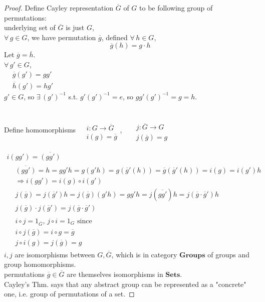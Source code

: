 \begin{proof}
	Define Cayley representation $\overline{G}$ of $G$ to be following group of permutations: \\
	underlying set of $\overline{G}$ is just $G$, \\
	$\forall \, g\in G$, we have permutation $\overline{g}$, defined $\forall \, h \in G$, 
	\[
	\overline{g}(h) = g\cdot h
	\]
	Let $\overline{g} = \overline{h}$. \\
	$\forall \, g' \in G$, \\
	$\begin{aligned}
	& \overline{g}(g') = gg' \\ 
	& \overline{h}(g') = hg'
	\end{aligned}$ \\
	$g' \in G$, so $\exists \, (g')^{-1}$ s.t. $g'(g')^{-1} =e$, so $gg'(g')^{-1}= g=h$.
	
	\quad \\
	Define homomorphisms $\begin{aligned} & \quad \\ 
	& i : G \to \overline{G} \\
	& i(g) = \overline{g}
	\end{aligned}$, \qquad \, $\begin{aligned} & \quad \\ 
	& j : \overline{G} \to G \\
	& j(\overline{g}) =  g
	\end{aligned}$
	
	\[
	\begin{gathered} 
	i(gg') = \overline{(gg')} \\
	\begin{aligned}
	& \overline{(gg')} = h = gg' h = g(g'h) = g(\overline{g}'(h)) = \overline{g}(\overline{g}'(h)) = i(g) = i(g') h \\ 
	& \Longrightarrow i(gg') = i(g) \circ i(g') \\
	& j(\overline{g}) = j(\overline{g}') h = j(\overline{g}) (g'h) = gg'h = j(\overline{gg'})h = j(\overline{g} \cdot \overline{g}') h \\
	& j(\overline{g}) \cdot j(\overline{g}') = j(\overline{g} \cdot \overline{g}')
	\end{aligned} \\
	\begin{aligned}
	& i\circ j = 1_{\overline{G}}, \, j \circ i = 1_G \text{ since } \\
	& i \circ j (\overline{g}) = i\circ g = \overline{g} \\
	& j\circ i (g) = j(\overline{g}) = g
	\end{aligned}
\end{gathered} 	
	\]
	$i,j$ are isomorphisms between $G,\overline{G}$, which is in category $\textbf{Groups}$ of groups and group homomorphisms. \\
	permutations $\overline{g} \in \overline{G}$ are themselves isomorphisms in $\textbf{Sets}$. \\
	Cayley's Thm. says that any abstract group can be represented as a "concrete" one, i.e. group of permutations of a set.
\end{proof}

